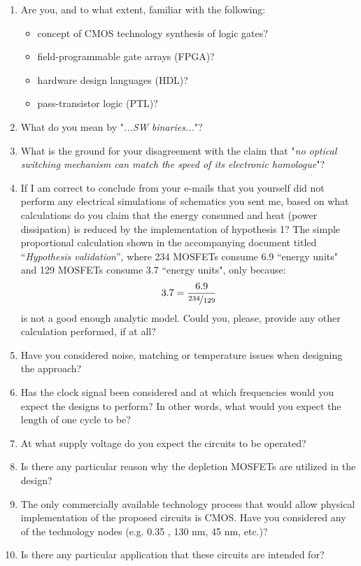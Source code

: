 \documentclass[12pt]{article}
\begin{document}
\begin{enumerate}
\item Are you, and to what extent, familiar with the following:
\begin{itemize}
\item concept of CMOS technology synthesis of logic gates?
\item field-programmable gate arrays (FPGA)?
\item hardware design languages (HDL)?
\item pass-transistor logic (PTL)?
\end{itemize} 
\item What do you mean by "\textit{...SW binaries...}"?
\item What is the ground for your disagreement with the claim that "\textit{no optical switching mechanism can match the speed of its electronic homologue}"?
\item If I am correct to conclude from your e-mails that you yourself did not perform any electrical simulations of schematics you sent me, based on what calculations do you claim that the energy consumed and heat (power dissipation) is reduced by the implementation of hypothesis 1? The simple proportional calculation shown in the accompanying document titled ``\textit{Hypothesis validation}'', where 234 MOSFETs consume 6.9 ``energy units" and 129 MOSFETs consume 3.7 ``energy units", only because:
\begin{equation}
3.7 = \frac{6.9}{\nicefrac{234}{129}}
\end{equation}
is not a good enough analytic model. Could you, please, provide any other calculation performed, if at all?
\item Have you considered noise, matching or temperature issues when designing the approach?
\item Has the clock signal been considered and at which frequencies would you expect the designs to perform? In other words, what would you expect the length of one cycle to be?
\item At what supply voltage do you expect the circuits to be operated?
\item Is there any particular reason why the depletion MOSFETs are utilized in the design?
\item The only commercially available technology process that would allow physical implementation of the proposed circuits is CMOS. Have you considered any of the technology nodes (e.g. 0.35 \textmugreek, 130 nm, 45 nm, etc.)?
\item Is there any particular application that these circuits are intended for?
\end{enumerate}
\end{document}
